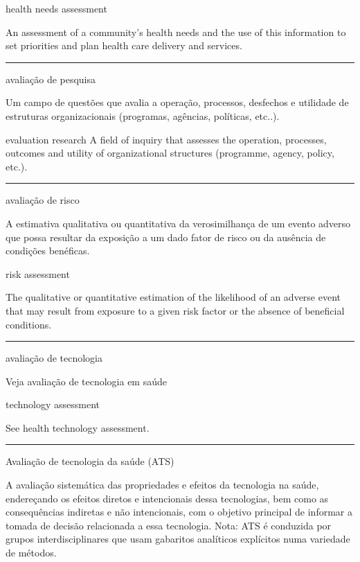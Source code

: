 \documentclass[
  openany]{book}
\begin{document}
health needs assessment

An assessment of a community's health needs and the use of this information to set priorities and plan health care delivery and services.

\begin{center}\rule{0.5\linewidth}{0.5pt}\end{center}

avaliação de pesquisa

Um campo de questões que avalia a operação, processos, desfechos e utilidade de estruturas organizacionais (programas, agências, políticas, etc..).

evaluation research
A field of inquiry that assesses the operation, processes, outcomes and utility of organizational structures (programme, agency, policy, etc.).

\begin{center}\rule{0.5\linewidth}{0.5pt}\end{center}

avaliação de risco

A estimativa qualitativa ou quantitativa da verosimilhança de um evento adverso que possa resultar da exposição a um dado fator de risco ou da ausência de condições benéficas.

risk assessment

The qualitative or quantitative estimation of the likelihood of an adverse event that may result from exposure to a given risk factor or the absence of beneficial conditions.

\begin{center}\rule{0.5\linewidth}{0.5pt}\end{center}

avaliação de tecnologia

Veja avaliação de tecnologia em saúde

technology assessment

See health technology assessment.

\begin{center}\rule{0.5\linewidth}{0.5pt}\end{center}

Avaliação de tecnologia da saúde (ATS)

A avaliação sistemática das propriedades e efeitos da tecnologia na saúde, endereçando os efeitos diretos e intencionais dessa tecnologias, bem como as consequências indiretas e não intencionais, com o objetivo principal de informar a tomada de decisão relacionada a essa tecnologia. Nota: ATS é conduzida por grupos interdisciplinares que usam gabaritos analíticos explícitos numa variedade de métodos.
\end{document}

